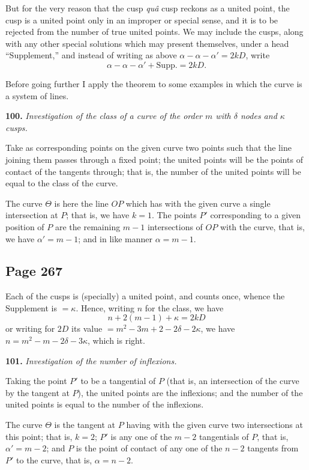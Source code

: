 \documentclass[11pt,a4paper]{article}
\theoremstyle{definition}
\begin{document}
But for the very reason that the cusp \textit{qu\^a} cusp reckons as a united point, the cusp is a united point only in an improper or special sense, and it is to be rejected from the number of true united points. We may include the cusps, along with any other special solutions which may present themselves, under a head ``Supplement,'' and instead of writing as above $\alpha - \alpha - \alpha' = 2kD$, write
\[
\alpha - \alpha - \alpha' + \text{Supp.} = 2kD.
\]

Before going further I apply the theorem to some examples in which the curve is a system of lines.

\medskip
\noindent\textbf{100.} \textit{Investigation of the class of a curve of the order $m$ with $\delta$ nodes and $\kappa$ cusps.}

Take as corresponding points on the given curve two points such that the line joining them passes through a fixed point; the united points will be the points of contact of the tangents through; that is, the number of the united points will be equal to the class of the curve.

The curve $\Theta$ is here the line $OP$ which has with the given curve a single intersection at $P$; that is, we have $k = 1$. The points $P'$ corresponding to a given position of $P$ are the remaining $m - 1$ intersections of $OP$ with the curve, that is, we have $\alpha' = m - 1$; and in like manner $\alpha = m - 1$.

\subsection*{Page 267}

Each of the cusps is (specially) a united point, and counts once, whence the Supplement is $= \kappa$. Hence, writing $n$ for the class, we have
\[
n + 2(m - 1) + \kappa = 2kD
\]
or writing for $2D$ its value $= m^2 - 3m + 2 - 2\delta - 2\kappa$, we have $n = m^2 - m - 2\delta - 3\kappa$, which is right.

\medskip
\noindent\textbf{101.} \textit{Investigation of the number of inflexions.}

Taking the point $P'$ to be a tangential of $P$ (that is, an intersection of the curve by the tangent at $P$), the united points are the inflexions; and the number of the united points is equal to the number of the inflexions.

The curve $\Theta$ is the tangent at $P$ having with the given curve two intersections at this point; that is, $k = 2$; $P'$ is any one of the $m - 2$ tangentials of $P$, that is, $\alpha' = m - 2$; and $P$ is the point of contact of any one of the $n - 2$ tangents from $P'$ to the curve, that is, $\alpha = n - 2$.
\end{document}
